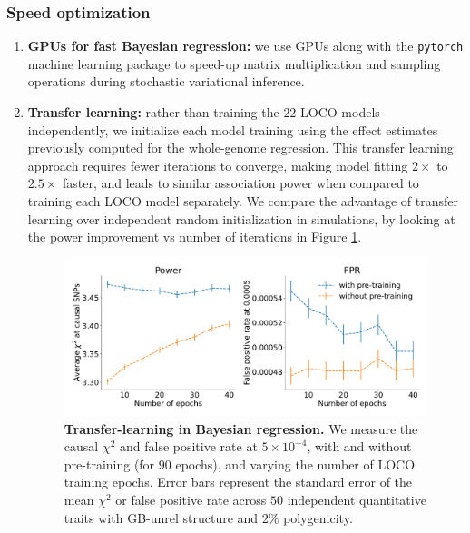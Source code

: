 \subsubsection{Speed optimization}
\begin{enumerate}
    \item \textbf{GPUs for fast Bayesian regression:} we use GPUs along with the \texttt{pytorch} machine learning package \cite{paszke2017automatic} to speed-up matrix multiplication and sampling operations during stochastic variational inference.
    \item \textbf{Transfer learning:} rather than training the $22$ LOCO models independently, we initialize each model training using the effect estimates previously computed for the whole-genome regression.
    This transfer learning approach requires fewer iterations to converge, making model fitting $2\times$ to $2.5\times$ faster, and leads to similar association power when compared to training each LOCO model separately.
    We compare the advantage of transfer learning over independent random initialization in simulations, by looking at the power improvement vs number of iterations in Figure \ref{fig:transfer}.

    \begin{figure}[h]
    \centering
    \includegraphics[width=\textwidth]{figures/transfer.pdf}
    \caption{\textbf{
    Transfer-learning in Bayesian regression.}
    We measure the causal $\chi^2$ and false positive rate at $5 \times 10^{-4}$, with and without pre-training (for $90$ epochs), and varying the number of LOCO training epochs.
    Error bars represent the standard error of the mean $\chi^2$ or false positive rate across $50$ independent quantitative traits with GB-unrel structure and $2\%$ polygenicity.
    }
    \label{fig:transfer}
\end{figure}
    


\end{enumerate}
